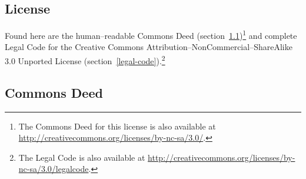 \documentclass[12pt,letterpaper,oneside,final]{memoir}
\begin{document}
\begin{appendices}

\chapter{License}
\label{license}
\SingleSpacing
Found here are the human--readable Commons Deed (section~\ref{commons-deed})\footnote{The Commons Deed for this license is also available at %
 \href{http://creativecommons.org/licenses/by-nc-sa/3.0/}{http://creativecommons.org/licenses/by-nc-sa/3.0/}.} and complete Legal Code for the Creative Commons Attribution--NonCommercial--ShareAlike 3.0 Unported License \ccbyncsa{} (section~\ref{legal-code}).\footnote{The Legal Code is also available at \href{http://creativecommons.org/licenses/by-nc-sa/3.0/legalcode}{http://creativecommons.org/licenses/by-nc-sa/3.0/legalcode}.}

\section{Commons Deed}
\label{commons-deed}


\end{appendices}
\end{document}
